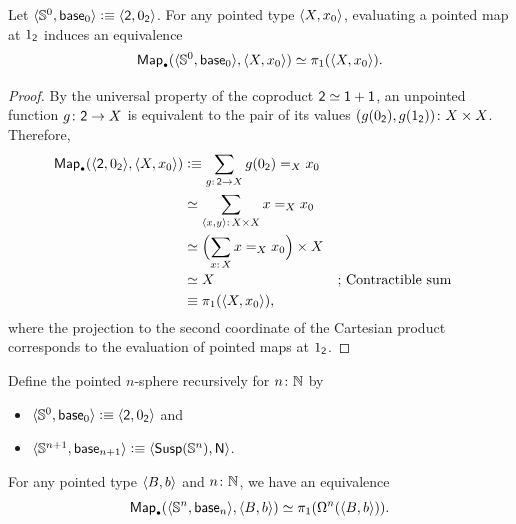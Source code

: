 \begin{lem}\label{lem:map-s0}
    Let\/ $\langle\mathbb S^0,\mathsf{base}_0\rangle \mathrel{\vcentcolon}\equiv \langle\mathsf{2},0_{\mathsf{2}}\rangle$. For any pointed type\/ $\langle X,x_0\rangle$, evaluating a pointed map at\/ $1_{\mathsf{2}}$ induces an equivalence
    \[
        \fun{Map}_\sbull(\dep{\sphere^0,\fun{base}_0},\dep{X,x_0}) \simeq \pi_1(\dep{X,x_0}).
    \]
\end{lem}

\begin{proof}
    By the universal property of the coproduct $\mathsf{2}\simeq\mathsf{1}+\mathsf{1}$, an unpointed function $g\colon\fun2\to X$ is equivalent to the pair of its values $(g(0_{\fun2}),g(1_{\fun2}))\colon X\times X$. Therefore,
    \begin{align*}
        \fun{Map}_\sbull
            (
                \dep{\fun2,0_{\fun2}},
                \dep{X,x_0}
            )
            &\defeq\sum_{g\colon\fun2\to X}
                g(0_{\fun2})\eq Xx_0\\
            &\simeq\sum_{\dep{x,y}\colon X\times X}
                x\eq Xx_0\\
            &\simeq
                \Bigl(
                    \sum_{x\colon X}x\eq Xx_0
                \Bigr)\times X\\
            &\simeq X
                &&\text{; Contractible sum}\\
            &\equiv\pi_1(\dep{X,x_0}),
    \end{align*}
    where the projection to the second coordinate of the Cartesian product corresponds to the evaluation of pointed maps at $1_{\mathsf{2}}$.
\end{proof}

\begin{prop}\label{prop:pointed-univ-prop-sn}
    Define the pointed\/ $n$-sphere recursively for\/ $n\colon\N$ by
    \begin{itemize}
        \item $\langle\mathbb S^0,\mathsf{base}_0\rangle\mathrel{\vcentcolon}\equiv\langle\mathsf{2},0_{\mathsf{2}}\rangle$ and

        \item $\langle\mathbb S^{n+1},\mathsf{base}_{n+1}\rangle \mathrel{\vcentcolon}\equiv \langle\mathsf{Susp}(\mathbb S^n),\mathsf{N}\rangle$. 
    \end{itemize}
    For any pointed type\/ $\langle B,b\rangle$ and\/ $n\colon\N$, we have an equivalence
    \[
        \fun{Map}_\sbull
            (
                \dep{\sphere^n,\fun{base}_n},
                \dep{B,b}
            )
            \simeq\pi_1(\Omega^n(\dep{B,b})).
    \]
\end{prop}

